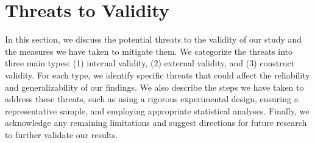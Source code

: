 \section{Threats to Validity}
\label{threats}
In this section, we discuss the potential threats to the validity of our study and the measures we have taken to mitigate them. We categorize the threats into three main types: (1) internal validity, (2) external validity, and (3) construct validity. For each type, we identify specific threats that could affect the reliability and generalizability of our findings. We also describe the steps we have taken to address these threats, such as using a rigorous experimental design, ensuring a representative sample, and employing appropriate statistical analyses. Finally, we acknowledge any remaining limitations and suggest directions for future research to further validate our results.